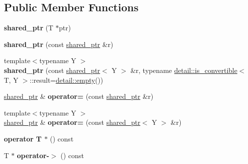 \subsection*{Public Member Functions}
\begin{DoxyCompactItemize}
\item 
\hypertarget{classboost_1_1shared__ptr_acb29c6ad2af65894625ffcb34c60e2fd}{{\bfseries shared\+\_\+ptr} (T $\ast$ptr)}\label{classboost_1_1shared__ptr_acb29c6ad2af65894625ffcb34c60e2fd}

\item 
\hypertarget{classboost_1_1shared__ptr_a99b6463f3170ea310a2b0f9a86bd13a7}{{\bfseries shared\+\_\+ptr} (const \hyperlink{classboost_1_1shared__ptr}{shared\+\_\+ptr} \&r)}\label{classboost_1_1shared__ptr_a99b6463f3170ea310a2b0f9a86bd13a7}

\item 
\hypertarget{classboost_1_1shared__ptr_a1fbdc54f011d5b6e95f22991631e5133}{{\footnotesize template$<$typename Y $>$ }\\{\bfseries shared\+\_\+ptr} (const \hyperlink{classboost_1_1shared__ptr}{shared\+\_\+ptr}$<$ Y $>$ \&r, typename \hyperlink{structboost_1_1detail_1_1is__convertible}{detail\+::is\+\_\+convertible}$<$ T, Y $>$\+::result=\hyperlink{structboost_1_1detail_1_1empty}{detail\+::empty}())}\label{classboost_1_1shared__ptr_a1fbdc54f011d5b6e95f22991631e5133}

\item 
\hypertarget{classboost_1_1shared__ptr_a6a5900bc54715cbe02924b9181e01b2f}{\hyperlink{classboost_1_1shared__ptr}{shared\+\_\+ptr} \& {\bfseries operator=} (const \hyperlink{classboost_1_1shared__ptr}{shared\+\_\+ptr} \&r)}\label{classboost_1_1shared__ptr_a6a5900bc54715cbe02924b9181e01b2f}

\item 
\hypertarget{classboost_1_1shared__ptr_a2a0a321d7d7da9fbbbb1fc6c6a1b7fbc}{{\footnotesize template$<$typename Y $>$ }\\\hyperlink{classboost_1_1shared__ptr}{shared\+\_\+ptr} \& {\bfseries operator=} (const \hyperlink{classboost_1_1shared__ptr}{shared\+\_\+ptr}$<$ Y $>$ \&r)}\label{classboost_1_1shared__ptr_a2a0a321d7d7da9fbbbb1fc6c6a1b7fbc}

\item 
\hypertarget{classboost_1_1shared__ptr_ad26095a1574b80b521ea9e31c4772d71}{{\bfseries operator T $\ast$} () const }\label{classboost_1_1shared__ptr_ad26095a1574b80b521ea9e31c4772d71}

\item 
\hypertarget{classboost_1_1shared__ptr_a50929edc66c13e45b25cbe858dfdbe3a}{T $\ast$ {\bfseries operator-\/$>$} () const }\label{classboost_1_1shared__ptr_a50929edc66c13e45b25cbe858dfdbe3a}


\end{DoxyCompactItemize}
